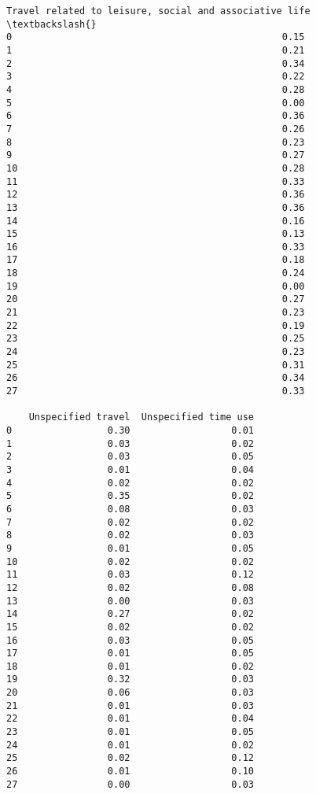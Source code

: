 \documentclass[11pt]{article}
\begin{document}
\begin{Verbatim}[commandchars=\\\{\}]
    Travel related to leisure, social and associative life  \textbackslash{}
0                                                0.15        
1                                                0.21        
2                                                0.34        
3                                                0.22        
4                                                0.28        
5                                                0.00        
6                                                0.36        
7                                                0.26        
8                                                0.23        
9                                                0.27        
10                                               0.28        
11                                               0.33        
12                                               0.36        
13                                               0.36        
14                                               0.16        
15                                               0.13        
16                                               0.33        
17                                               0.18        
18                                               0.24        
19                                               0.00        
20                                               0.27        
21                                               0.23        
22                                               0.19        
23                                               0.25        
24                                               0.23        
25                                               0.31        
26                                               0.34        
27                                               0.33        

    Unspecified travel  Unspecified time use  
0                 0.30                  0.01  
1                 0.03                  0.02  
2                 0.03                  0.05  
3                 0.01                  0.04  
4                 0.02                  0.02  
5                 0.35                  0.02  
6                 0.08                  0.03  
7                 0.02                  0.02  
8                 0.02                  0.03  
9                 0.01                  0.05  
10                0.02                  0.02  
11                0.03                  0.12  
12                0.02                  0.08  
13                0.00                  0.03  
14                0.27                  0.02  
15                0.02                  0.02  
16                0.03                  0.05  
17                0.01                  0.05  
18                0.01                  0.02  
19                0.32                  0.03  
20                0.06                  0.03  
21                0.01                  0.03  
22                0.01                  0.04  
23                0.01                  0.05  
24                0.01                  0.02  
25                0.02                  0.12  
26                0.01                  0.10  
27                0.00                  0.03  


\end{Verbatim}
\end{document}
